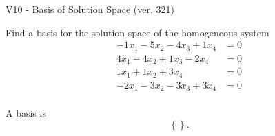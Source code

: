 \begin{exercise}
  \begin{exerciseTitle}V10 - Basis of Solution Space (ver. 321)\end{exerciseTitle}
  \begin{exerciseStatement}
    Find a basis for the solution space of the homogeneous system 
\begin{align*}
 -1 x_ 1 -5 x_ 2 -4 x_ 3 + 1 x_ 4 &= 0  \\ 
  4 x_ 1 -4 x_ 2 + 1 x_ 3 -2 x_ 4 &= 0  \\ 
  1 x_ 1 + 1 x_ 2 + 3 x_ 4 &= 0  \\ 
  -2 x_ 1 -3 x_ 2 -3 x_ 3 + 3 x_ 4 &= 0  \\ 
 \end{align*}


 
  \end{exerciseStatement}

  \begin{exerciseAnswer}
   A basis is   
\[\left\{\right\}.\]

  


  \end{exerciseAnswer}
\end{exercise}